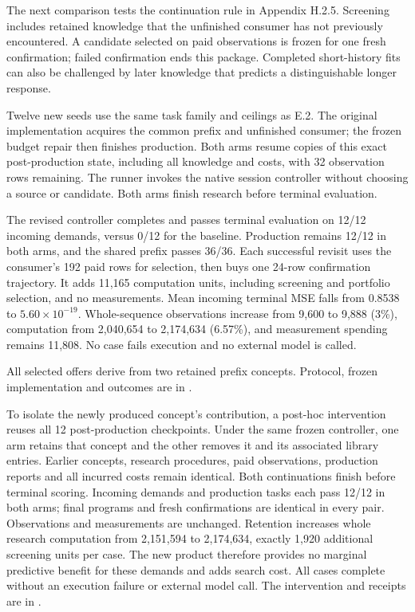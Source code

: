 \documentclass[twoside,11pt]{article}
\begin{document}
The next comparison tests the continuation rule in Appendix H.2.5. Screening includes
retained knowledge that the unfinished consumer has not previously encountered.
A candidate selected on paid observations is frozen for one fresh confirmation;
failed confirmation ends this package. Completed short-history fits can also be
challenged by later knowledge that predicts a distinguishable longer response.


Twelve new seeds use the same task family and ceilings as E.2. The original
implementation acquires the common prefix and unfinished consumer; the frozen
budget repair then finishes production. Both arms resume copies of this exact
post-production state, including all knowledge and costs, with 32 observation
rows remaining. The runner invokes the native session controller without choosing
a source or candidate. Both arms finish research before terminal evaluation.


The revised controller completes and passes terminal evaluation on 12/12 incoming
demands, versus 0/12 for the baseline. Production remains 12/12 in both arms,
and the shared prefix passes 36/36. Each successful revisit uses the consumer's
192 paid rows for selection, then buys one 24-row confirmation trajectory. It
adds 11,165 computation units, including screening and portfolio selection, and
no measurements. Mean incoming terminal MSE falls from 0.8538 to
\(5.60\times10^{-19}\). Whole-sequence observations increase from 9,600 to 9,888
(3\%), computation from 2,040,654 to 2,174,634 (6.57\%), and measurement spending
remains 11,808. No case fails execution and no external model is called.


All selected offers derive from two retained prefix concepts. Protocol, frozen
implementation and outcomes are in .


To isolate the newly produced concept's contribution, a post-hoc intervention
reuses all 12 post-production checkpoints. Under the same frozen controller, one
arm retains that concept and the other removes it and its associated library
entries. Earlier concepts, research procedures, paid observations, production
reports and all incurred costs remain identical. Both continuations finish
before terminal scoring. Incoming demands and production tasks each pass 12/12
in both arms; final programs and fresh confirmations are identical in every
pair. Observations and measurements are unchanged. Retention increases whole
research computation from 2,151,594 to 2,174,634, exactly 1,920 additional
screening units per case. The new product therefore provides no marginal
predictive benefit for these demands and adds search cost. All cases complete
without an execution failure or external model call. The intervention and
receipts are in .
\end{document}
